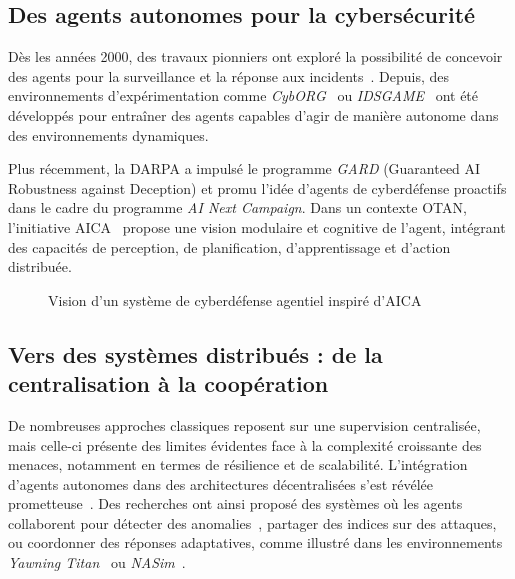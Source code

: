 \documentclass[ twoside,openright,titlepage,numbers=noenddot,headinclude,%
                footinclude=true,cleardoublepage=empty,abstractoff, %
                BCOR=5mm,paper=a4,fontsize=11pt,%
                french,american,%
                ]{scrreprt}
\begin{document}
\subsection*{Des agents autonomes pour la cybersécurité}

Dès les années 2000, des travaux pionniers ont exploré la possibilité de concevoir des agents pour la surveillance et la réponse aux incidents~\cite{Jansen2000}. Depuis, des environnements d'expérimentation comme \emph{CybORG}~\cite{Standen2021} ou \emph{IDSGAME}~\cite{Yang2024} ont été développés pour entraîner des agents capables d'agir de manière autonome dans des environnements dynamiques.

Plus récemment, la DARPA a impulsé le programme \emph{GARD} (Guaranteed AI Robustness against Deception) et promu l'idée d'agents de cyberdéfense proactifs dans le cadre du programme \emph{AI Next Campaign}. Dans un contexte OTAN, l'initiative AICA~\cite{AICAReport2021, Kott2018} propose une vision modulaire et cognitive de l'agent, intégrant des capacités de perception, de planification, d'apprentissage et d'action distribuée.

\begin{figure}[H]
    \centering
    \caption{Vision d'un système de cyberdéfense agentiel inspiré d'AICA}
    \label{fig:agent_architecture}
\end{figure}

\subsection*{Vers des systèmes distribués : de la centralisation à la coopération}

De nombreuses approches classiques reposent sur une supervision centralisée, mais celle-ci présente des limites évidentes face à la complexité croissante des menaces, notamment en termes de résilience et de scalabilité. L'intégration d'agents autonomes dans des architectures décentralisées s'est révélée prometteuse~\cite{Sommer2010, Buczak2015}. Des recherches ont ainsi proposé des systèmes où les agents collaborent pour détecter des anomalies~\cite{Shahid2021}, partager des indices sur des attaques, ou coordonner des réponses adaptatives, comme illustré dans les environnements \emph{Yawning Titan}~\cite{Andrew2022} ou \emph{NASim}~\cite{Janisch2024}.
\end{document}

